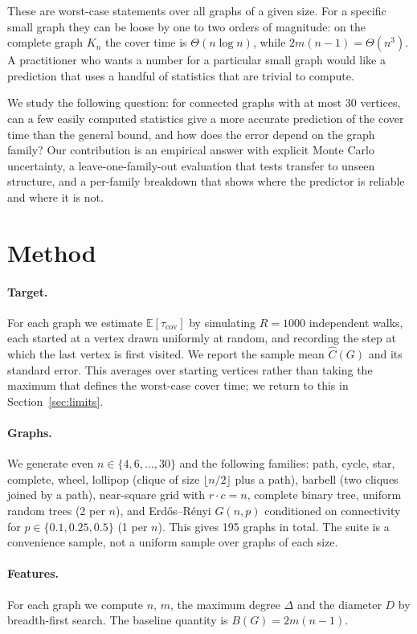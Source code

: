 \documentclass{article}
\begin{document}
These are worst-case statements over all graphs of a given size. For a specific small graph they can be loose by one to two orders of magnitude: on the complete graph $K_n$ the cover time is $\Theta(n\log n)$, while $2m(n-1)=\Theta(n^3)$. A practitioner who wants a number for a particular small graph would like a prediction that uses a handful of statistics that are trivial to compute.

We study the following question: for connected graphs with at most 30 vertices, can a few easily computed statistics give a more accurate prediction of the cover time than the general bound, and how does the error depend on the graph family? Our contribution is an empirical answer with explicit Monte Carlo uncertainty, a leave-one-family-out evaluation that tests transfer to unseen structure, and a per-family breakdown that shows where the predictor is reliable and where it is not.

\section{Method}
\label{sec:method}

\paragraph{Target.} For each graph we estimate $\mathbb{E}[\tau_{\text{cov}}]$ by simulating $R=1000$ independent walks, each started at a vertex drawn uniformly at random, and recording the step at which the last vertex is first visited. We report the sample mean $\hat{C}(G)$ and its standard error. This averages over starting vertices rather than taking the maximum that defines the worst-case cover time; we return to this in Section~\ref{sec:limits}.

\paragraph{Graphs.} We generate even $n\in\{4,6,\dots,30\}$ and the following families: path, cycle, star, complete, wheel, lollipop (clique of size $\lfloor n/2\rfloor$ plus a path), barbell (two cliques joined by a path), near-square grid with $r\cdot c=n$, complete binary tree, uniform random trees (2 per $n$), and Erd\H{o}s--R\'enyi $G(n,p)$ conditioned on connectivity for $p\in\{0.1,0.25,0.5\}$ (1 per $n$). This gives 195 graphs in total. The suite is a convenience sample, not a uniform sample over graphs of each size.

\paragraph{Features.} For each graph we compute $n$, $m$, the maximum degree $\Delta$ and the diameter $D$ by breadth-first search. The baseline quantity is $B(G)=2m(n-1)$.
\end{document}
